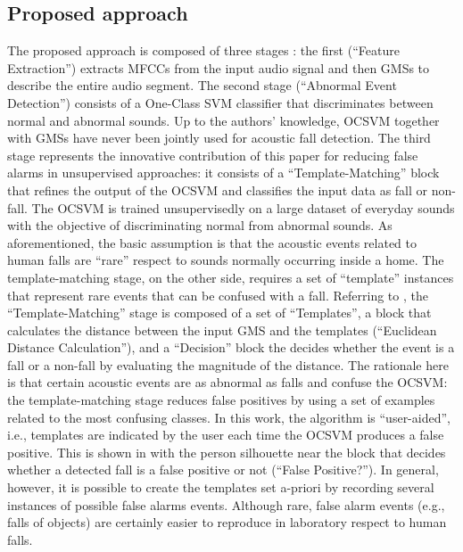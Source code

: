 \subsection{Proposed approach}
The proposed approach is composed of three stages : the first (``Feature Extraction'') extracts MFCCs from the input audio signal and then GMSs to describe the entire audio segment. The second stage (``Abnormal Event Detection'') consists of a One-Class SVM classifier that discriminates between normal and abnormal sounds. Up to the authors' knowledge, OCSVM together with GMSs have never been jointly used for acoustic fall detection.  The third stage represents the innovative contribution of this paper for reducing false alarms in unsupervised approaches: it consists of a ``Template-Matching'' block that refines the output of the OCSVM and classifies the input data as fall or non-fall. The OCSVM is trained unsupervisedly on a large dataset of everyday sounds with the objective of discriminating normal from abnormal sounds. As aforementioned, the basic assumption is that the acoustic events related to human falls are ``rare'' respect to sounds normally occurring inside a home. The template-matching stage, on the other side, requires a set of ``template'' instances that represent rare events that can be confused with a fall. Referring to , the ``Template-Matching'' stage is composed of a set of ``Templates'', a block that calculates the distance between the input GMS and the templates (``Euclidean Distance Calculation''), and a ``Decision'' block the decides whether the event is a fall or a non-fall by evaluating the magnitude of the distance.  The rationale here is that certain acoustic events are as abnormal as falls and confuse the OCSVM: the template-matching stage reduces false positives by using a set of examples related to the most confusing classes. In this work, the algorithm is ``user-aided'', i.e., templates are indicated by the user each time the OCSVM produces a false positive. This is shown in  with the person silhouette near the block that decides whether a detected fall is a false positive or not (``False Positive?''). In general, however, it is possible to create the templates set a-priori by recording several instances of possible false alarms events. Although rare, false alarm events (e.g., falls of objects) are certainly easier to reproduce in laboratory respect to human falls.

